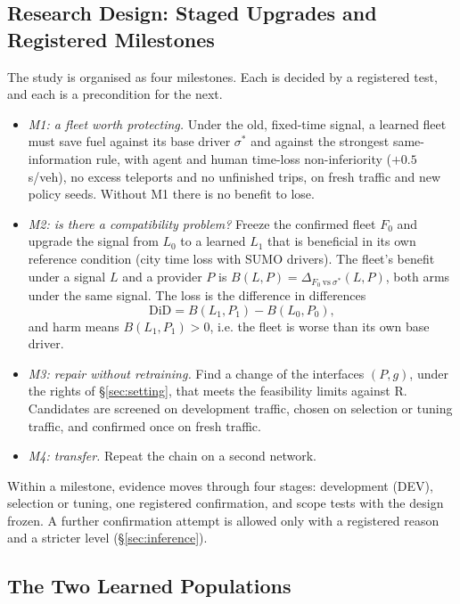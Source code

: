 \subsection{Research Design: Staged Upgrades and Registered Milestones}\label{sec:rdesign}
The study is organised as four milestones. Each is decided by a registered test, and each is a precondition for the next.
\begin{itemize}\setlength\itemsep{1pt}
\item \emph{M1: a fleet worth protecting.} Under the old, fixed-time signal, a learned fleet must save fuel against its base driver
$\sigma^*$ and against the strongest same-information rule, with agent and human time-loss non-inferiority ($+0.5$\,s/veh), no excess
teleports and no unfinished trips, on fresh traffic and new policy seeds. Without M1 there is no benefit to lose.
\item \emph{M2: is there a compatibility problem?} Freeze the confirmed fleet $F_0$ and upgrade the signal from $L_0$ to a learned $L_1$
that is beneficial in its own reference condition (city time loss with SUMO drivers). The fleet's benefit under a signal $L$ and a provider
$P$ is $B(L,P)=\Delta_{F_0\ \mathrm{vs}\ \sigma^*}(L,P)$, both arms under the same signal. The loss is the difference in differences
\begin{equation}
\mathrm{DiD}=B(L_1,P_1)-B(L_0,P_0),
\end{equation}
and harm means $B(L_1,P_1)>0$, i.e. the fleet is worse than its own base driver.
\item \emph{M3: repair without retraining.} Find a change of the interfaces $(P,g)$, under the rights of §\ref{sec:setting}, that meets the
feasibility limits against R. Candidates are screened on development traffic, chosen on selection or tuning traffic, and confirmed once on
fresh traffic.
\item \emph{M4: transfer.} Repeat the chain on a second network.
\end{itemize}
Within a milestone, evidence moves through four stages: development (DEV), selection or tuning, one registered confirmation, and scope tests
with the design frozen. A further confirmation attempt is allowed only with a registered reason and a stricter level (§\ref{sec:inference}).

\subsection{The Two Learned Populations}\label{sec:populations}
